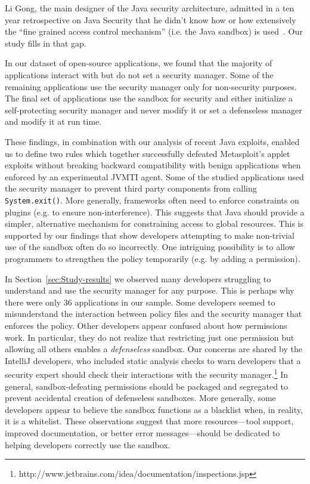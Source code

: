 \documentclass{sig-alternate}
\begin{document}
Li Gong, the main designer of the Java security architecture,
admitted in a ten year retrospective on Java Security that he didn't
know how or how extensively the ``fine grained access control mechanism''
(i.e. the Java sandbox) is used~\cite{gong2009java}.
Our study fills in that gap.

In our dataset of open-source applications, we found
that the majority of applications interact with but do not set a security
manager. Some of the remaining applications use the security manager
only for non-security purposes. The final set of applications use
the sandbox for security and either initialize a self-protecting security
manager and never modify it or set a defenseless manager and modify
it at run time. 

These findings, in combination with our analysis of recent Java exploits,
enabled us to define two rules which together successfully
defeated Metasploit's applet exploits without breaking backward compatibility with benign applications when enforced by an experimental JVMTI agent. Some of the studied applications
used the security manager to prevent third party components from calling
\texttt{System.exit()}. More generally, frameworks often need to enforce
constraints on plugins (e.g. to ensure non-interference). This suggests
that Java should provide a simpler, alternative mechanism for constraining
access to global resources. This is supported by our findings that
show developers attempting to make non-trivial use of the sandbox
often do so incorrectly. One intriguing possibility is to allow programmers
to strengthen the policy temporarily (e.g. by adding a permission). 

In Section~\ref{sec:Study-results} we observed many developers struggling to understand and
use the security manager for any purpose. This is perhaps why there
were only 36 applications in our sample. Some developers seemed to
misunderstand the interaction between policy files and the security
manager that enforces the policy. Other developers appear confused
about how permissions work. In particular, they do not realize that
restricting just one permission but allowing all others enables a
\emph{defenseless} sandbox. Our concerns are shared by the IntelliJ developers, who included static analysis checks to warn developers that a security expert should check their interactions with the security manager.\footnote{http://www.jetbrains.com/idea/documentation/inspections.jsp%
} In general, sandbox-defeating permissions
should be packaged and segregated to prevent accidental creation of
defenseless sandboxes. More generally, some developers appear to believe
the sandbox functions as a blacklist when, in reality, it is a whitelist.
These observations suggest that more resources---tool support, improved
documentation, or better error messages---should be dedicated to helping
developers correctly use the sandbox. 



\end{document}
